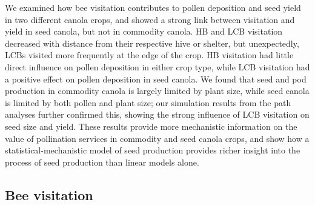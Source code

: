 \documentclass[12pt]{article} %
\begin{document}
We examined how bee visitation contributes to pollen deposition and seed yield in two different canola crops, and showed a strong link between visitation and yield in seed canola, but not in commodity canola.
HB and LCB visitation decreased with distance from their respective hive or shelter, but unexpectedly, LCBs visited more frequently at the edge of the crop.
HB visitation had little direct influence on pollen deposition in either crop type, while LCB visitation had a positive effect on pollen deposition in seed canola.
We found that seed and pod production in commodity canola is largely limited by plant size, while seed canola is limited by both pollen and plant size; our simulation results from the path analyses further confirmed this, showing the strong influence of LCB visitation on seed size and yield.
These results provide more mechanistic information on the value of pollination services in commodity and seed canola crops, and show how a statistical-mechanistic model of seed production provides richer insight into the process of seed production than linear models alone.

\subsection*{Bee visitation} 
\end{document}
